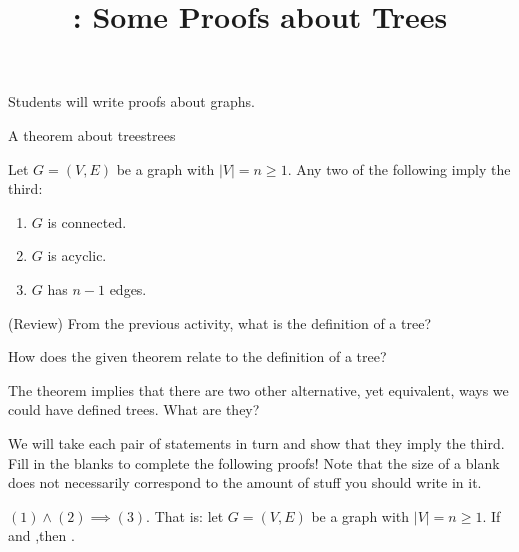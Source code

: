 \documentclass{tufte-handout}
\title{\thecourse: Some Proofs about Trees}
\date{}
\begin{document}
\maketitle

\begin{objective}
  Students will write proofs about graphs.
\end{objective}

\begin{model*}{A theorem about trees}{trees}
\begin{thm}[Trees]
  Let $G = (V,E)$ be a graph with $|V| = n \geq 1$.  Any two of the following
  imply the third:
  \begin{enumerate}
  \item $G$ is connected.
  \item $G$ is acyclic.
  \item $G$ has $n-1$ edges.
  \end{enumerate}
\end{thm}
\end{model*}

\begin{questions}
  \item (Review) From the previous activity, what is the definition of
    a tree?
  \item How does the given theorem relate to the definition of a tree?
  \item The theorem implies that there are two other alternative, yet
    equivalent, ways we could have defined trees.  What are they?
\end{questions}

We will take each pair of statements in turn and show that they imply
the third.  Fill in the blanks to complete the following proofs!  Note
that the size of a blank does not necessarily correspond to the
amount of stuff you should write in it.

\begin{lem} \label{lem:onetwothree}
  $(1) \land (2) \implies (3)$.  That is: let $G = (V,E)$ be a graph with $|V|
  = n \geq 1$.  If \blank\linebreak and \blank,\linebreak then \blank.
\end{lem}
\end{document}
